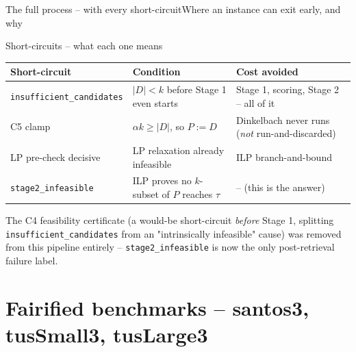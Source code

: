 \documentclass[aspectratio=169,10pt]{beamer}
\begin{document}
\begin{frame}{The full process -- with every short-circuit}{Where an instance can exit early, and why}
\begin{center}
{}
\end{center}
\end{frame}

\begin{frame}{Short-circuits -- what each one means}
\small
\begin{tabular}{@{}p{3.1cm}p{5.1cm}p{3.6cm}@{}}
\toprule
\textbf{Short-circuit} & \textbf{Condition} & \textbf{Cost avoided} \\
\midrule
\cellcolor{SoftAmber!60}\texttt{insufficient\_\allowbreak candidates} & $|D|<k$ before Stage 1 even starts & Stage 1, scoring, Stage 2 -- all of it \\[4pt]
\cellcolor{Muted!25}C5 clamp & $\alpha k \geq |D|$, so $P{:=}D$ & Dinkelbach never runs (\emph{not} run-and-discarded) \\[4pt]
\cellcolor{SoftRed!70}LP pre-check decisive & LP relaxation already infeasible & ILP branch-and-bound \\[4pt]
\cellcolor{SoftRed!70}\texttt{stage2\_\allowbreak infeasible} & ILP proves no $k$-subset of $P$ reaches $\tau$ & -- (this is the answer) \\
\bottomrule
\end{tabular}
\vspace{8pt}

{\footnotesize\color{Ink2} The C4 feasibility certificate (a would-be short-circuit \emph{before} Stage 1, splitting \texttt{insufficient\_candidates} from an "intrinsically infeasible" cause) was removed from this pipeline entirely -- \texttt{stage2\_infeasible} is now the only post-retrieval failure label.}
\end{frame}

\section{Fairified benchmarks -- santos3, tusSmall3, tusLarge3}
\end{document}
